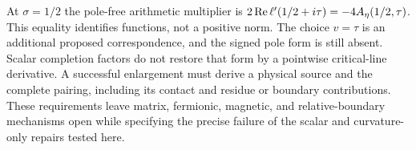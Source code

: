 At $\sigma=1/2$ the pole-free arithmetic multiplier is
$2\operatorname{Re}\ell'(1/2+i\tau)=-4A_\eta(1/2,\tau)$.
This equality identifies functions, not a positive norm.  The choice
$v=\tau$ is an additional proposed correspondence, and the signed pole
form is still absent.  Scalar completion factors do not restore that form
by a pointwise critical-line derivative.  A successful enlargement must
derive a physical source and the complete pairing, including its contact
and residue or boundary contributions.  These requirements leave matrix,
fermionic, magnetic, and relative-boundary mechanisms open while specifying
the precise failure of the scalar and curvature-only repairs tested here.

